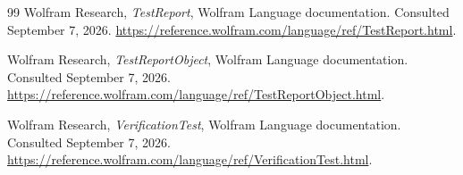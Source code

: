 \documentclass[11pt,a4paper]{article}
\theoremstyle{definition}
\theoremstyle{remark}
\begin{document}
\begin{thebibliography}{99}
Wolfram Research, \emph{TestReport}, Wolfram Language documentation.
Consulted September 7, 2026.
\url{https://reference.wolfram.com/language/ref/TestReport.html}.

Wolfram Research, \emph{TestReportObject}, Wolfram Language documentation.
Consulted September 7, 2026.
\url{https://reference.wolfram.com/language/ref/TestReportObject.html}.

Wolfram Research, \emph{VerificationTest}, Wolfram Language documentation.
Consulted September 7, 2026.
\url{https://reference.wolfram.com/language/ref/VerificationTest.html}.
\end{thebibliography}
\end{document}
